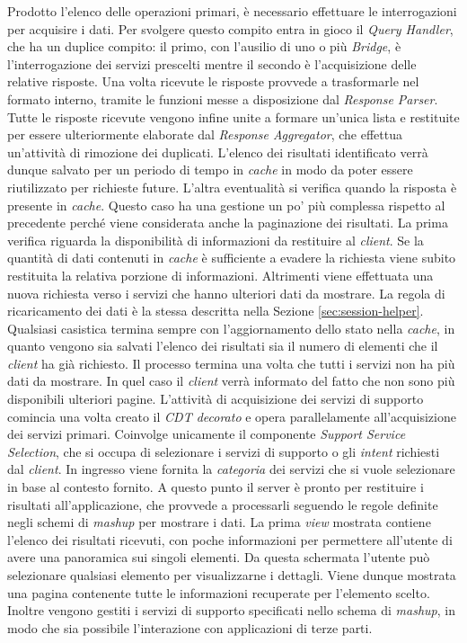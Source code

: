 Prodotto l'elenco delle operazioni primari, è necessario effettuare le interrogazioni per acquisire i dati. Per svolgere questo compito entra in gioco il \emph{Query Handler}, che ha un duplice compito: il primo, con l'ausilio di uno o più \emph{Bridge}, è l'interrogazione dei servizi prescelti mentre il secondo è l'acquisizione delle relative risposte. Una volta ricevute le risposte provvede a trasformarle nel formato interno, tramite le funzioni messe a disposizione dal \emph{Response Parser}. Tutte le risposte ricevute vengono infine unite a formare un'unica lista e restituite per essere ulteriormente elaborate dal \emph{Response Aggregator}, che effettua un'attività di rimozione dei duplicati. L'elenco dei risultati identificato verrà dunque salvato per un periodo di tempo in \emph{cache} in modo da poter essere riutilizzato per richieste future.
L'altra eventualità si verifica quando la risposta è presente in \emph{cache}. Questo caso ha una gestione un po' più complessa rispetto al precedente perché viene considerata anche la paginazione dei risultati. La prima verifica riguarda la disponibilità di informazioni da restituire al \emph{client}. Se la quantità di dati contenuti in \emph{cache} è sufficiente a evadere la richiesta viene subito restituita la relativa porzione di informazioni. Altrimenti viene effettuata una nuova richiesta verso i servizi che hanno ulteriori dati da mostrare. La regola di ricaricamento dei dati è la stessa descritta nella Sezione \ref{sec:session-helper}. Qualsiasi casistica termina sempre con l'aggiornamento dello stato nella \emph{cache}, in quanto vengono sia salvati l'elenco dei risultati sia il numero di elementi che il \emph{client} ha già richiesto. Il processo termina una volta che tutti i servizi non ha più dati da mostrare. In quel caso il \emph{client} verrà informato del fatto che non sono più disponibili ulteriori pagine.
L'attività di acquisizione dei servizi di supporto comincia una volta creato il \emph{CDT decorato} e opera parallelamente all'acquisizione dei servizi primari. Coinvolge unicamente il componente \emph{Support Service Selection}, che si occupa di selezionare i servizi di supporto o gli \emph{intent} richiesti dal \emph{client}. In ingresso viene fornita la \emph{categoria} dei servizi che si vuole selezionare in base al contesto fornito.
A questo punto il server è pronto per restituire i risultati all'applicazione, che provvede a processarli seguendo le regole definite negli schemi di \emph{mashup} per mostrare i dati.
La prima \emph{view} mostrata contiene l'elenco dei risultati ricevuti, con poche informazioni per permettere all'utente di avere una panoramica sui singoli elementi. Da questa schermata l'utente può selezionare qualsiasi elemento per visualizzarne i dettagli. Viene dunque mostrata una pagina contenente tutte le informazioni recuperate per l'elemento scelto. Inoltre vengono gestiti i servizi di supporto specificati nello schema di \emph{mashup}, in modo che sia possibile l'interazione con applicazioni di terze parti.